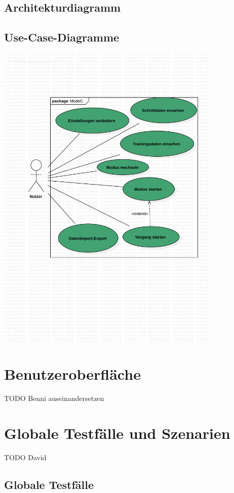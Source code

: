 \documentclass[a4paper,12pt]{article}
\begin{document}
  \subsection{Architekturdiagramm}
  \subsection{Use-Case-Diagramme}
\begin{center}
\includegraphics[width=0.8\textwidth]{Vorlaeufiges Use-Case Diagram.pdf}
\end{center}
\section{Benutzeroberfläche}
TODO Benni auseinandersetzen
\section{Globale Testfälle und Szenarien}
TODO David
  \subsection{Globale Testfälle}
\end{document}
